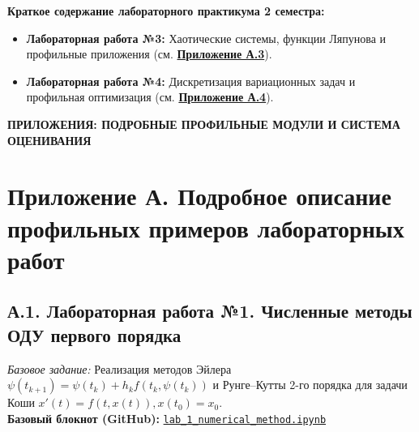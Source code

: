 \documentclass[12pt]{article}
\begin{document}
\begin{greenblock}
\textbf{Краткое содержание лабораторного практикума 2 семестра:}
\begin{itemize}[nosep]
    \item \textbf{Лабораторная работа №3:} Хаотические системы, функции Ляпунова и профильные приложения (см. \hyperref[app:A3]{\textbf{Приложение А.3}}).
    \item \textbf{Лабораторная работа №4:} Дискретизация вариационных задач и профильная оптимизация (см. \hyperref[app:A4]{\textbf{Приложение А.4}}).
\end{itemize}
\end{greenblock}

\newpage

\begin{center}
{\Large\textbf{ПРИЛОЖЕНИЯ: ПОДРОБНЫЕ ПРОФИЛЬНЫЕ МОДУЛИ И СИСТЕМА ОЦЕНИВАНИЯ}}
\end{center}

\section*{Приложение А. Подробное описание профильных примеров лабораторных работ}\label{app:A}

\subsection*{А.1. Лабораторная работа №1. Численные методы ОДУ первого порядка}\label{app:A1}
\textit{Базовое задание:} Реализация методов Эйлера $\psi(t_{k+1}) = \psi(t_k) + h_k f(t_k, \psi(t_k))$ и Рунге--Кутты 2-го порядка для задачи Коши $x'(t) = f(t, x(t)), x(t_0) = x_0$.\\[0.2em]
\textbf{Базовый блокнот (GitHub):} \href{https://github.com/SikioN/dif-eq/blob/main/lab/lab_1_numerical_method.ipynb}{\texttt{lab\_1\_numerical\_method.ipynb}}
\end{document}
